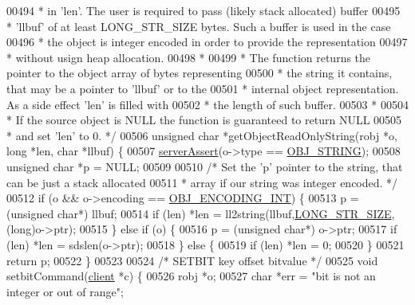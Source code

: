 \begin{DoxyCode}
{00494 \textcolor{comment}{ * in 'len'. The user is required to pass (likely stack allocated) buffer}
00495 \textcolor{comment}{ * 'llbuf' of at least LONG\_STR\_SIZE bytes. Such a buffer is used in the case}
00496 \textcolor{comment}{ * the object is integer encoded in order to provide the representation}
00497 \textcolor{comment}{ * without usign heap allocation.}
00498 \textcolor{comment}{ *}
00499 \textcolor{comment}{ * The function returns the pointer to the object array of bytes representing}
00500 \textcolor{comment}{ * the string it contains, that may be a pointer to 'llbuf' or to the}
00501 \textcolor{comment}{ * internal object representation. As a side effect 'len' is filled with}
00502 \textcolor{comment}{ * the length of such buffer.}
00503 \textcolor{comment}{ *}
00504 \textcolor{comment}{ * If the source object is NULL the function is guaranteed to return NULL}
00505 \textcolor{comment}{ * and set 'len' to 0. */}
00506 \textcolor{keywordtype}{unsigned} \textcolor{keywordtype}{char} *getObjectReadOnlyString(robj *o, \textcolor{keywordtype}{long} *len, \textcolor{keywordtype}{char} *llbuf) \{
00507     \hyperlink{server_8h_a88114b5169b4c382df6b56506285e56a}{serverAssert}(o->type == \hyperlink{server_8h_a65236ea160f69cdef33ec942092af88f}{OBJ\_STRING});
00508     \textcolor{keywordtype}{unsigned} \textcolor{keywordtype}{char} *p = NULL;
00509 
00510     \textcolor{comment}{/* Set the 'p' pointer to the string, that can be just a stack allocated}
00511 \textcolor{comment}{     * array if our string was integer encoded. */}
00512     \textcolor{keywordflow}{if} (o && o->encoding == \hyperlink{server_8h_ae934cf008a0be0ef009c92c2d006a816}{OBJ\_ENCODING\_INT}) \{
00513         p = (\textcolor{keywordtype}{unsigned} \textcolor{keywordtype}{char}*) llbuf;
00514         \textcolor{keywordflow}{if} (len) *len = ll2string(llbuf,\hyperlink{server_8h_a39ec35278876f65fc1ef70b049856ca3}{LONG\_STR\_SIZE},(\textcolor{keywordtype}{long})o->ptr);
00515     \} \textcolor{keywordflow}{else} \textcolor{keywordflow}{if} (o) \{
00516         p = (\textcolor{keywordtype}{unsigned} \textcolor{keywordtype}{char}*) o->ptr;
00517         \textcolor{keywordflow}{if} (len) *len = sdslen(o->ptr);
00518     \} \textcolor{keywordflow}{else} \{
00519         \textcolor{keywordflow}{if} (len) *len = 0;
00520     \}
00521     \textcolor{keywordflow}{return} p;
00522 \}
00523 
00524 \textcolor{comment}{/* SETBIT key offset bitvalue */}
00525 \textcolor{keywordtype}{void} setbitCommand(\hyperlink{structclient}{client} *c) \{
00526     robj *o;
00527     \textcolor{keywordtype}{char} *err = \textcolor{stringliteral}{"bit is not an integer or out of range"};
}
\end{DoxyCode}
